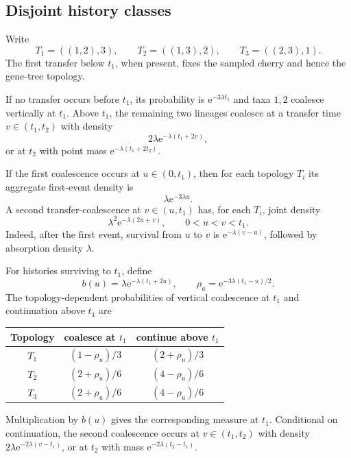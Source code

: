 \documentclass[11pt]{article}
\newcommand{\e}{\mathrm e}
\begin{document}
\subsection{Disjoint history classes}
Write
\[
T_1=((1,2),3),\qquad T_2=((1,3),2),\qquad T_3=((2,3),1).
\]
The first transfer below $t_1$, when present, fixes the sampled cherry and hence the gene-tree topology.

If no transfer occurs before $t_1$, its probability is $\e^{-3\lambda t_1}$ and taxa $1,2$ coalesce vertically at $t_1$.  Above $t_1$, the remaining two lineages coalesce at a transfer time $v\in(t_1,t_2)$ with density
\[
2\lambda\e^{-\lambda(t_1+2v)},
\]
or at $t_2$ with point mass $\e^{-\lambda(t_1+2t_2)}$.

If the first coalescence occurs at $u\in(0,t_1)$, then for each topology $T_i$ its aggregate first-event density is
\[
\lambda\e^{-3\lambda u}.
\]
A second transfer-coalescence at $v\in(u,t_1)$ has, for each $T_i$, joint density
\begin{equation}\label{eq:below-density}
\lambda^2\e^{-\lambda(2u+v)},\qquad 0<u<v<t_1.
\end{equation}
Indeed, after the first event, survival from $u$ to $v$ is $\e^{-\lambda(v-u)}$, followed by absorption density $\lambda$.

For histories surviving to $t_1$, define
\[
b(u)=\lambda\e^{-\lambda(t_1+2u)},
\qquad
\rho_u=\e^{-3\lambda(t_1-u)/2}.
\]
The topology-dependent probabilities of vertical coalescence at $t_1$ and continuation above $t_1$ are
\begin{center}
\begin{tabular}{c|cc}
\toprule
Topology & coalesce at $t_1$ & continue above $t_1$\\
\midrule
$T_1$ & $(1-\rho_u)/3$ & $(2+\rho_u)/3$\\
$T_2$ & $(2+\rho_u)/6$ & $(4-\rho_u)/6$\\
$T_3$ & $(2+\rho_u)/6$ & $(4-\rho_u)/6$\\
\bottomrule
\end{tabular}
\end{center}
Multiplication by $b(u)$ gives the corresponding measure at $t_1$.  Conditional on continuation, the second coalescence occurs at $v\in(t_1,t_2)$ with density $2\lambda\e^{-2\lambda(v-t_1)}$, or at $t_2$ with mass $\e^{-2\lambda(t_2-t_1)}$.
\end{document}
